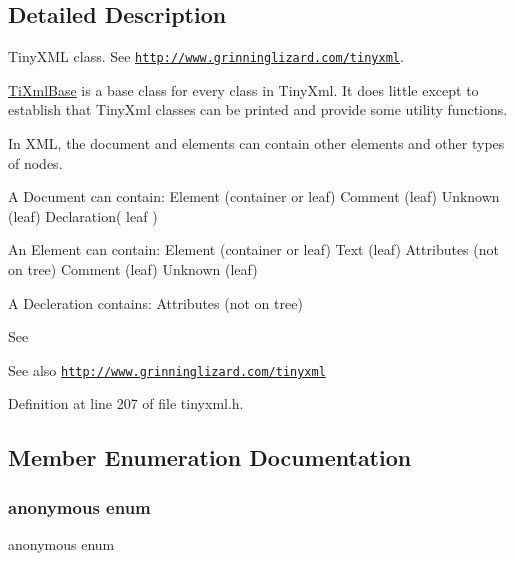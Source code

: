 \subsection{Detailed Description}
Tiny\+X\+ML class. See \href{http://www.grinninglizard.com/tinyxml}{\tt http\+://www.\+grinninglizard.\+com/tinyxml}. 

\hyperlink{class_ti_xml_base}{Ti\+Xml\+Base} is a base class for every class in Tiny\+Xml. It does little except to establish that Tiny\+Xml classes can be printed and provide some utility functions.

In X\+ML, the document and elements can contain other elements and other types of nodes.

\begin{DoxyVerb}A Document can contain:     Element (container or leaf)
Comment (leaf)
Unknown (leaf)
Declaration( leaf )

An Element can contain:     Element (container or leaf)
Text        (leaf)
Attributes (not on tree)
Comment (leaf)
Unknown (leaf)

A Decleration contains: Attributes (not on tree)
\end{DoxyVerb}


See \begin{DoxySeeAlso}{See also}
\href{http://www.grinninglizard.com/tinyxml}{\tt http\+://www.\+grinninglizard.\+com/tinyxml} 
\end{DoxySeeAlso}


Definition at line 207 of file tinyxml.\+h.



\subsection{Member Enumeration Documentation}
\hypertarget{class_ti_xml_base_a4b788e6990f18d930cc68e38587f05cd}{}\label{class_ti_xml_base_a4b788e6990f18d930cc68e38587f05cd} 
\subsubsection{\texorpdfstring{anonymous enum}{anonymous enum}}
{\footnotesize\ttfamily anonymous enum}

